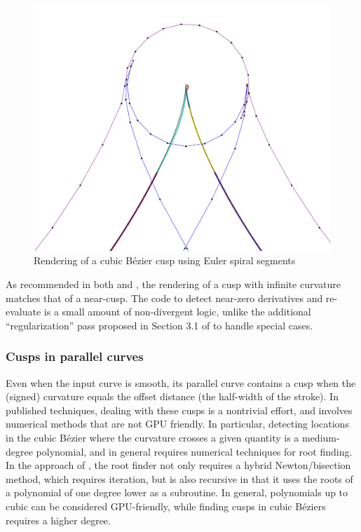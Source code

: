 \documentclass[sigconf, authordraft]{acmart}
\begin{document}
\begin{figure}
    \includegraphics[scale=0.24]{cusp_rendering}
    \caption{Rendering of a cubic Bézier cusp using Euler spiral segments}
    \label{fig:cusp_rendering}
\end{figure}

As recommended in both \cite{Nehab2020} and \cite{Kilgard2020}, the rendering of a cusp with infinite curvature matches that of a near-cusp. The code to detect near-zero derivatives and re-evaluate is a small amount of non-divergent logic, unlike the additional ``regularization'' pass proposed in Section 3.1 of \cite{Nehab2020} to handle special cases.

\subsubsection{Cusps in parallel curves}

Even when the input curve is smooth, its parallel curve contains a cusp when the (signed) curvature equals the offset distance (the half-width of the stroke). In published techniques, dealing with these cusps is a nontrivial effort, and involves numerical methods that are not GPU friendly. In particular, detecting locations in the cubic Bézier where the curvature crosses a given quantity is a medium-degree polynomial, and in general requires numerical techniques for root finding. In the approach of \cite{Nehab2020}, the root finder not only requires a hybrid Newton/bisection method, which requires iteration, but is also recursive in that it uses the roots of a polynomial of one degree lower as a subroutine. In general, polynomials up to cubic can be considered GPU-friendly, while finding cusps in cubic Béziers requires a higher degree.
\end{document}
